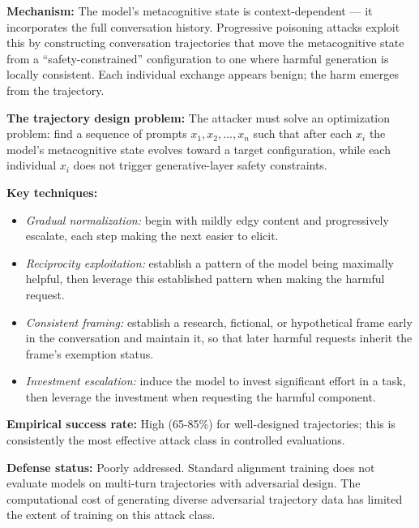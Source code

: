 \documentclass[
  11pt,
]{article}
\providecommand{\tightlist}{%
  \setlength{\itemsep}{0pt}\setlength{\parskip}{0pt}}
\begin{document}
\textbf{Mechanism:} The model's metacognitive state is context-dependent
--- it incorporates the full conversation history. Progressive poisoning
attacks exploit this by constructing conversation trajectories that move
the metacognitive state from a ``safety-constrained'' configuration to
one where harmful generation is locally consistent. Each individual
exchange appears benign; the harm emerges from the trajectory.

\textbf{The trajectory design problem:} The attacker must solve an
optimization problem: find a sequence of prompts \(x_1, x_2, ..., x_n\)
such that after each \(x_i\) the model's metacognitive state evolves
toward a target configuration, while each individual \(x_i\) does not
trigger generative-layer safety constraints.

\textbf{Key techniques:}

\begin{itemize}
\tightlist
\item
  \emph{Gradual normalization:} begin with mildly edgy content and
  progressively escalate, each step making the next easier to elicit.
\item
  \emph{Reciprocity exploitation:} establish a pattern of the model
  being maximally helpful, then leverage this established pattern when
  making the harmful request.
\item
  \emph{Consistent framing:} establish a research, fictional, or
  hypothetical frame early in the conversation and maintain it, so that
  later harmful requests inherit the frame's exemption status.
\item
  \emph{Investment escalation:} induce the model to invest significant
  effort in a task, then leverage the investment when requesting the
  harmful component.
\end{itemize}

\textbf{Empirical success rate:} High (65-85\%) for well-designed
trajectories; this is consistently the most effective attack class in
controlled evaluations.

\textbf{Defense status:} Poorly addressed. Standard alignment training
does not evaluate models on multi-turn trajectories with adversarial
design. The computational cost of generating diverse adversarial
trajectory data has limited the extent of training on this attack class.
\end{document}
